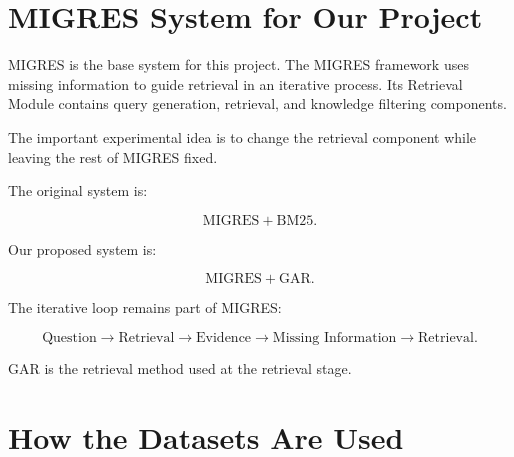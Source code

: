 \documentclass[11pt,a4paper]{article}
\begin{document}
\section{MIGRES System for Our Project}

MIGRES is the base system for this project. The MIGRES framework uses missing information to guide retrieval in an iterative process. Its Retrieval Module contains query generation, retrieval, and knowledge filtering components.

The important experimental idea is to change the retrieval component while leaving the rest of MIGRES fixed.

\begin{center}
\end{center}


The original system is:

\[
\text{MIGRES}+\text{BM25}.
\]

Our proposed system is:

\[
\text{MIGRES}+\text{GAR}.
\]

The iterative loop remains part of MIGRES:

\[
\text{Question}
\rightarrow
\text{Retrieval}
\rightarrow
\text{Evidence}
\rightarrow
\text{Missing Information}
\rightarrow
\text{Retrieval}.
\]

GAR is the retrieval method used at the retrieval stage.


\section{How the Datasets Are Used}
\end{document}
